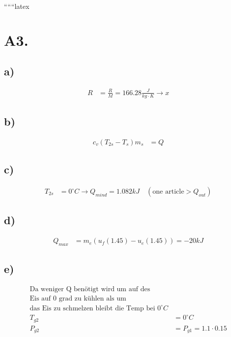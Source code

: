
``````latex


\section*{A3.}
\subsection*{a)}
\begin{align*}
    R &= \frac{R}{M} = 166.28 \frac{J}{kg \cdot K} \rightarrow x
\end{align*}

\subsection*{b)}
\begin{align*}
    c_v (T_{2s} - T_s) m_s &= Q
\end{align*}

\subsection*{c)}
\begin{align*}
    T_{2s} &= 0^\circ C \rightarrow Q_{mind} = 1.082 kJ \quad (\text{one article} > Q_{out})
\end{align*}

\subsection*{d)}
\begin{align*}
    Q_{max} &= m_e (u_f(1.45) - u_e(1.45)) = -20 kJ
\end{align*}

\subsection*{e)}
\begin{align*}
    \text{Da weniger Q benötigt wird um auf des} \\
    \text{Eis auf 0 grad zu kühlen als um} \\
    \text{das Eis zu schmelzen bleibt die Temp bei 0}^\circ C \\
    T_{g2} &= 0^\circ C \\
    P_{g2} &= P_{g1} = 1.1 \cdot 0.15
\end{align*}

